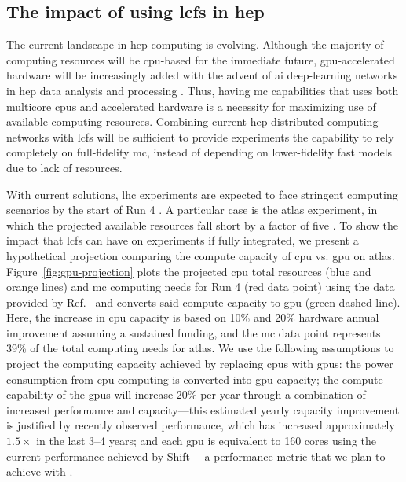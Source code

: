 \subsection{The impact of using \acp{lcf} in \ac{hep}}

The current landscape in \ac{hep} computing is evolving. Although the majority
of computing resources will be \ac{cpu}-based for the immediate future,
\ac{gpu}-accelerated hardware will be increasingly added with the advent of
\ac{ai} deep-learning networks in \ac{hep} data analysis and processing
\cite{radovic_machine_2018}. Thus, having \ac{mc} capabilities that uses both
multicore \acp{cpu} and accelerated hardware is a necessity for maximizing use
of available computing resources. Combining current \ac{hep} distributed
computing networks with \acp{lcf} will be sufficient to provide experiments the
capability to rely completely on full-fidelity \ac{mc}, instead of depending on
lower-fidelity fast models due to lack of resources.

With current solutions, \acs{lhc} experiments are expected to face stringent
computing scenarios by the start of Run 4 \cite{LHC-schedule}. A particular case
is the \acs{atlas} experiment, in which the projected available resources fall
short by a factor of five \cite{the_atlas_collaboration_atlas_2020,
the_hep_software_foundation_roadmap_2019}. To show the impact that \acp{lcf} can
have on experiments if fully integrated, we present a hypothetical projection
comparing the compute capacity of \ac{cpu} vs. \ac{gpu} on \acs{atlas}.
Figure~\ref{fig:gpu-projection} plots the projected \ac{cpu} total resources
(blue and orange lines) and \ac{mc} computing needs for Run 4 (red data point)
using the data provided by Ref.~\cite{the_atlas_collaboration_atlas_2020} and
converts said compute capacity to \ac{gpu} (green dashed line). Here, the
increase in \ac{cpu} capacity is based on 10\% and 20\% hardware annual
improvement assuming a sustained funding, and the \ac{mc} data point represents
39\% of the total computing needs for \acs{atlas}. We use the following
assumptions to project the computing capacity achieved by replacing \acp{cpu}
with \acp{gpu}:  the power consumption from \ac{cpu} computing is
converted into \ac{gpu} capacity;  the compute capability of the
\acp{gpu} will increase 20\% per year through a combination of increased
performance and capacity---this estimated yearly capacity improvement is
justified by recently observed \nvidia performance, which has increased
approximately $1.5\times$ in the last \numrange{3}{4} years; and  each
\ac{gpu} is equivalent to 160 cores using the current performance achieved by
Shift \cite{hamilton_continuous-energy_2019}---a performance metric that we plan
to achieve with \celeritas.


